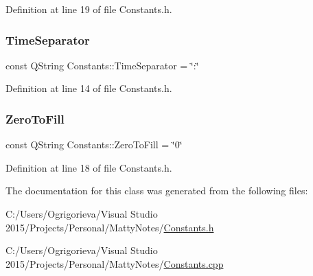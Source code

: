 Definition at line 19 of file Constants.\+h.

\hypertarget{classConstants_aa6a4e4e111634badc8b8aeba9df024ce}{}\label{classConstants_aa6a4e4e111634badc8b8aeba9df024ce} 
\subsubsection{\texorpdfstring{Time\+Separator}{TimeSeparator}}
{\footnotesize\ttfamily const Q\+String Constants\+::\+Time\+Separator = \char`\"{}\+:\char`\"{}\hspace{0.3cm}{\ttfamily [static]}}



Definition at line 14 of file Constants.\+h.

\hypertarget{classConstants_ace4bddf4b2dc0e05c8fec643238531a9}{}\label{classConstants_ace4bddf4b2dc0e05c8fec643238531a9} 
\subsubsection{\texorpdfstring{Zero\+To\+Fill}{ZeroToFill}}
{\footnotesize\ttfamily const Q\+String Constants\+::\+Zero\+To\+Fill = \char`\"{}0\char`\"{}\hspace{0.3cm}{\ttfamily [static]}}



Definition at line 18 of file Constants.\+h.



The documentation for this class was generated from the following files\+:\begin{DoxyCompactItemize}
\item 
C\+:/\+Users/\+Ogrigorieva/\+Visual Studio 2015/\+Projects/\+Personal/\+Matty\+Notes/\hyperlink{Constants_8h}{Constants.\+h}\item 
C\+:/\+Users/\+Ogrigorieva/\+Visual Studio 2015/\+Projects/\+Personal/\+Matty\+Notes/\hyperlink{Constants_8cpp}{Constants.\+cpp}\end{DoxyCompactItemize}
